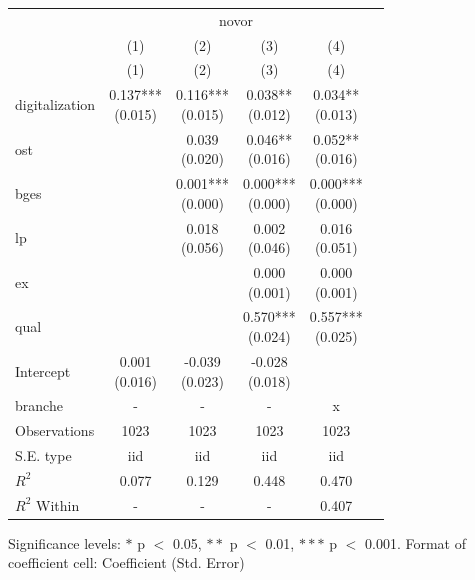 \renewcommand\cellalign{t}
\begin{threeparttable}
\begin{tabular}{lccccc}
\toprule
 & \multicolumn{4}{c}{novor} \\
\cmidrule(lr){2-5} 
 & (1) & (2) & (3) & (4) \\
 & (1) & (2) & (3) & (4) \\
\midrule
\addlinespace
digitalization & \makecell{0.137*** \\ (0.015)} & \makecell{0.116*** \\ (0.015)} & \makecell{0.038** \\ (0.012)} & \makecell{0.034** \\ (0.013)} \\
ost &  & \makecell{0.039 \\ (0.020)} & \makecell{0.046** \\ (0.016)} & \makecell{0.052** \\ (0.016)} \\
bges &  & \makecell{0.001*** \\ (0.000)} & \makecell{0.000*** \\ (0.000)} & \makecell{0.000*** \\ (0.000)} \\
lp &  & \makecell{0.018 \\ (0.056)} & \makecell{0.002 \\ (0.046)} & \makecell{0.016 \\ (0.051)} \\
ex &  &  & \makecell{0.000 \\ (0.001)} & \makecell{0.000 \\ (0.001)} \\
qual &  &  & \makecell{0.570*** \\ (0.024)} & \makecell{0.557*** \\ (0.025)} \\
Intercept & \makecell{0.001 \\ (0.016)} & \makecell{-0.039 \\ (0.023)} & \makecell{-0.028 \\ (0.018)} &  \\
\midrule
\addlinespace
branche & - & - & - & x \\
\midrule
\addlinespace
Observations & 1023 & 1023 & 1023 & 1023 \\
S.E. type & iid & iid & iid & iid \\
$R^2$ & 0.077 & 0.129 & 0.448 & 0.470 \\
$R^2$ Within & - & - & - & 0.407 \\
\bottomrule
\end{tabular}
\footnotesize Significance levels: $*$ p $<$ 0.05, $**$ p $<$ 0.01, $***$ p $<$ 0.001. Format of coefficient cell: Coefficient 
 (Std. Error)
\end{threeparttable}